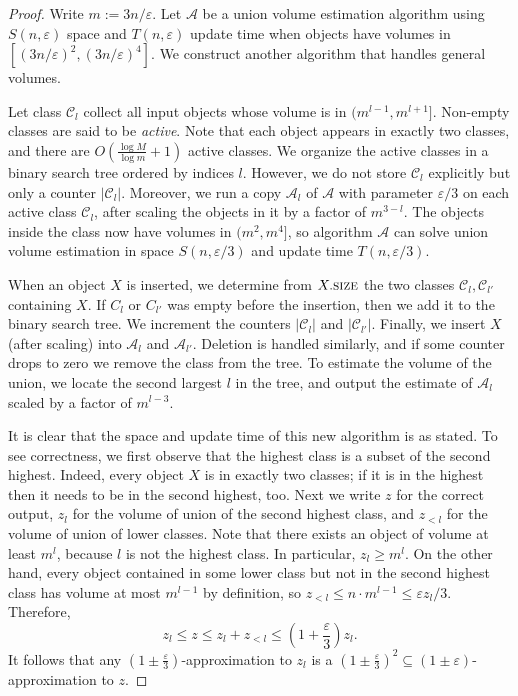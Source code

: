 \documentclass[a4paper, 11pt]{article}
\newcommand{\size}{\textsc{size}}
\newcommand{\Alg}{\mathcal{A}}
\newcommand{\eps}{\varepsilon}
\newcommand{\class}[1]{\mathcal{#1}}
\begin{document}
\begin{proof}
    Write $m := 3n/\eps$. Let $\Alg$ be a union volume estimation algorithm using $S(n,\eps)$ space and $T(n,\eps)$ update time when objects have volumes in $[(3n/\eps)^2, (3n/\eps)^4]$. We construct another algorithm that handles general volumes.
    
    Let class $\class{C}_l$ collect all input objects whose volume is in $(m^{l-1}, m^{l+1}]$. Non-empty classes are said to be \emph{active}. Note that each object appears in exactly two classes, and there are $O(\frac{\log M}{\log m} + 1)$ active classes. We organize the active classes in a binary search tree ordered by indices $l$. However, we do not store $\class{C}_l$ explicitly but only a counter $|\class{C}_l|$. Moreover, we run a copy $\Alg_l$ of $\Alg$ with parameter $\eps/3$ on each active class $\class{C}_l$, after scaling the objects in it by a factor of $m^{3-l}$. The objects inside the class now have volumes in $(m^2, m^4]$, so algorithm $\Alg$ can solve union volume estimation in space $S(n,\eps/3)$ and update time $T(n,\eps/3)$.
    
    When an object $X$ is inserted, we determine from $X.\size$ the two classes $\class{C}_l, \class{C}_{l'}$ containing $X$. If $C_l$ or $C_{l'}$ was empty before the insertion, then we add it to the binary search tree. We increment the counters $|\class{C}_l|$ and $|\class{C}_{l'}|$. Finally, we insert $X$ (after scaling) into $\Alg_l$ and $\Alg_{l'}$. Deletion is handled similarly, and if some counter drops to zero we remove the class from the tree. To estimate the volume of the union, we locate the second largest $l$ in the tree, and output the estimate of $\Alg_l$ scaled by a factor of $m^{l-3}$.

    It is clear that the space and update time of this new algorithm is as stated. To see correctness, we first observe that the highest class is a subset of the second highest. Indeed, every object $X$ is in exactly two classes; if it is in the highest then it needs to be in the second highest, too.
    Next we write $z$ for the correct output, $z_l$ for the volume of union of the second highest class, and $z_{<l}$ for the volume of union of lower classes. Note that there exists an object of volume at least $m^l$, because $l$ is not the highest class. In particular, $z_l \geq m^l$. On the other hand, every object contained in some lower class but not in the second highest class has volume at most $m^{l-1}$ by definition, so $z_{<l} \leq n \cdot m^{l-1} \leq \eps z_l/3$. Therefore,
    \[ z_l \leq z \leq z_l + z_{<l} \leq \left( 1+\frac{\eps}{3} \right) z_l. \]
    It follows that any $(1\pm\frac{\eps}{3})$-approximation to $z_l$ is a $(1\pm\frac{\eps}{3})^2 \subseteq(1\pm\eps)$-approximation to $z$.


\end{proof}
\end{document}
